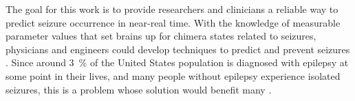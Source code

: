 The goal for this work is to provide researchers and clinicians a reliable way to predict seizure occurrence in near-real time.
With the knowledge of measurable parameter values that set brains up for chimera states related to seizures, physicians and engineers could develop techniques to predict and prevent seizures \autocite{Taylor2014}.
Since around \SI{3}{\percent} of the United States population is diagnosed with epilepsy at some point in their lives, and many people without epilepsy experience isolated seizures, this is a problem whose solution would benefit many \autocite{Kandel2013}.

